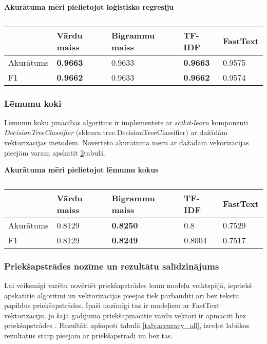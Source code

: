 \begin{table}[H]
\centering
\caption{\label{tab:accuracy_lr}}
\textbf{Akurātuma mēri pielietojot loģistisko regresiju\\}
\begin{tabular}{|l||l|l|l|l|}
\hline
& Vārdu maiss & Bigrammu maiss & TF-IDF & FastText \\ \hline
Akurātums &  \textbf{0.9663} & 0.9633 &  \textbf{0.9663} & 0.9575 \\ \hline
F1 &  \textbf{0.9662} & 0.9633 &  \textbf{0.9662} & 0.9574 \\ \hline
\end{tabular}
\end{table}

\subsubsection{Lēmumu koki}
Lēmumu koku pmācības algoritms ir implementēts ar \textit{scikit-learn} komponenti \textit{DecisionTreeClassifier} (sklearn.tree.DecisionTreeClassifier) ar dažādām vektorizācijas metodēm. Novērtēto akurātuma mēru ar dažādām vekorizācijas pieejām varam apskatīt \ref{tab:accuracy_dt}tabulā.

\begin{table}[H]
\centering
\caption{\label{tab:accuracy_dt}}
\textbf{Akurātuma mēri pielietojot lēmumu kokus\\}
\begin{tabular}{|l||l|l|l|l|}
\hline
& Vārdu maiss & Bigrammu maiss & TF-IDF & FastText \\ \hline
Akurātums & 0.8129 & \textbf{0.8250} & 0.8 & 0.7529 \\ \hline
F1 & 0.8129 & \textbf{0.8249} & 0.8004 & 0.7517 \\ \hline
\end{tabular}
\end{table}

\subsubsection{Priekšapstrādes nozīme un rezultātu salīdzinājums}

Lai veiksmīgi varētu novērtēt priekšapstrādes lomu modeļu veiktspējā, iepriekš apskatītie algoritmi un vektorizācijas pieejas tiek pārbaudīti arī bez tekstu papildus priekšapstrādes. Īpaši nozīmīgi tas ir modeļiem ar FastText vektorizāciju, jo šajā gadījumā priekšapmācītie vārdu vektori ir apmācīti bez priekšapstrādes \cite{grave2018learning}. Rezultāti apkopoti tabulā \ref{tab:accuracy_all}, izceļot labākos rezultātus starp pieejām ar priekšapstrādi un bez tās.

